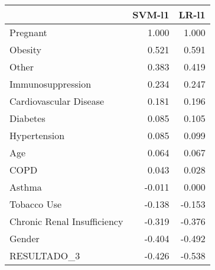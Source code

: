 \begin{tabular}{lrr}
\toprule
{} &  SVM-l1 &  LR-l1 \\
\midrule
Pregnant                    &   1.000 &  1.000 \\
Obesity                     &   0.521 &  0.591 \\
Other                       &   0.383 &  0.419 \\
Immunosuppression           &   0.234 &  0.247 \\
Cardiovascular Disease      &   0.181 &  0.196 \\
Diabetes                    &   0.085 &  0.105 \\
Hypertension                &   0.085 &  0.099 \\
Age                         &   0.064 &  0.067 \\
COPD                        &   0.043 &  0.028 \\
Asthma                      &  -0.011 &  0.000 \\
Tobacco Use                 &  -0.138 & -0.153 \\
Chronic Renal Insufficiency &  -0.319 & -0.376 \\
Gender                      &  -0.404 & -0.492 \\
RESULTADO\_3                 &  -0.426 & -0.538 \\
\bottomrule
\end{tabular}
